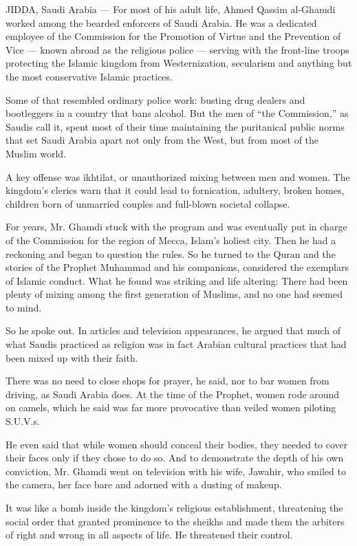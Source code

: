 JIDDA, Saudi Arabia --- For most of his adult life, Ahmed Qassim
al-Ghamdi worked among the bearded enforcers of Saudi Arabia. He was a
dedicated employee of the Commission for the Promotion of Virtue and the
Prevention of Vice --- known abroad as the religious police --- serving
with the front-line troops protecting the Islamic kingdom from
Westernization, secularism and anything but the most conservative
Islamic practices.

Some of that resembled ordinary police work: busting drug dealers and
bootleggers in a country that bans alcohol. But the men of ``the
Commission,'' as Saudis call it, spent most of their time maintaining
the puritanical public norms that set Saudi Arabia apart not only from
the West, but from most of the Muslim world.

A key offense was ikhtilat, or unauthorized mixing between men and
women. The kingdom's clerics warn that it could lead to fornication,
adultery, broken homes, children born of unmarried couples and
full-blown societal collapse.

For years, Mr. Ghamdi stuck with the program and was eventually put in
charge of the Commission for the region of Mecca, Islam's holiest city.
Then he had a reckoning and began to question the rules. So he turned to
the Quran and the stories of the Prophet Muhammad and his companions,
considered the exemplars of Islamic conduct. What he found was striking
and life altering: There had been plenty of mixing among the first
generation of Muslims, and no one had seemed to mind.

So he spoke out. In articles and television appearances, he argued that
much of what Saudis practiced as religion was in fact Arabian cultural
practices that had been mixed up with their faith.

There was no need to close shops for prayer, he said, nor to bar women
from driving, as Saudi Arabia does. At the time of the Prophet, women
rode around on camels, which he said was far more provocative than
veiled women piloting S.U.V.s.

He even said that while women should conceal their bodies, they needed
to cover their faces only if they chose to do so. And to demonstrate the
depth of his own conviction, Mr. Ghamdi went on television with his
wife, Jawahir, who smiled to the camera, her face bare and adorned with
a dusting of makeup.

It was like a bomb inside the kingdom's religious establishment,
threatening the social order that granted prominence to the sheikhs and
made them the arbiters of right and wrong in all aspects of life. He
threatened their control.

